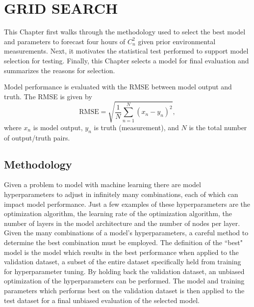 \chapter{GRID SEARCH}
\label{ch4}
This Chapter first walks through the methodology used to select the best model and parameters to forecast four hours of $C_{n}^{2}$ given prior environmental measurements. Next, it motivates the statistical test performed to support model selection for testing. Finally, this Chapter selects a model for final evaluation and summarizes the reasons for selection.

Model performance is evaluated with the \ac{RMSE} between model output and truth. The \ac{RMSE} is given by
\begin{equation} \label{eq:RMSE}
	\text{RMSE} = \sqrt{\frac{1}{N} \sum_{n=1}^{N} \left(x_{n} - y_{n}\right)^{2}},
\end{equation}
where $x_{n}$ is model output, $y_{n}$ is truth (measurement), and $N$ is the total number of output/truth pairs.

\section{Methodology}
\label{sec:grid_search_methodology}
Given a problem to model with machine learning there are model hyperparameters to adjust in infinitely many combinations, each of which can impact model performance. Just a few examples of these hyperparameters are the optimization algorithm, the learning rate of the optimization algorithm, the number of layers in the model architecture and the number of nodes per layer. Given the many combinations of a model's hyperparameters, a careful method to determine the best combination must be employed. The definition of the ``best" model is the model which results in the best performance when applied to the validation dataset, a subset of the entire dataset specifically held from training for hyperparameter tuning. By holding back the validation dataset, an unbiased optimization of the hyperparameters can be performed. The model and training parameters which performs best on the validation dataset is then applied to the test dataset for a final unbiased evaluation of the selected model.

